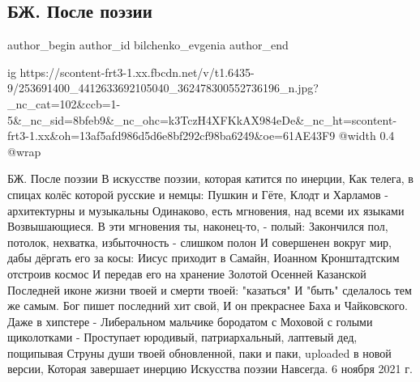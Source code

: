  
 
 
 
 
 
\subsection{БЖ. После поэзии}
\label{sec:06_11_2021.fb.bilchenko_evgenia.1.posle_poezii}
 
\ifcmt
 author_begin
   author_id bilchenko_evgenia
 author_end
\fi

\ifcmt
  ig https://scontent-frt3-1.xx.fbcdn.net/v/t1.6435-9/253691400_4412633692105040_362478300552736196_n.jpg?_nc_cat=102&ccb=1-5&_nc_sid=8bfeb9&_nc_ohc=k3TczH4XFKkAX984eDe&_nc_ht=scontent-frt3-1.xx&oh=13af5afd986d5d6e8bf292cf98ba6249&oe=61AE43F9
  @width 0.4
  @wrap 
\fi

БЖ. После поэзии
В искусстве поэзии, которая катится по инерции,
Как телега, в спицах колёс которой русские и немцы:
Пушкин и Гёте, Клодт и Харламов - архитектурны и музыкальны
Одинаково, есть мгновения, над всеми их языками
Возвышающиеся. В эти мгновения ты, наконец-то, - полый:
Закончился пол, потолок, нехватка, избыточность - слишком полон
И совершенен вокруг мир, дабы дёргать его за косы:
Иисус приходит в Самайн, Иоанном Кронштадтским отстроив космос
И передав его на хранение Золотой Осенней Казанской
Последней иконе жизни твоей и смерти твоей: "казаться"
И "быть" сделалось тем же самым. Бог пишет последний хит свой,
И он прекраснее Баха и Чайковского. Даже в хипстере -
Либеральном мальчике бородатом с Моховой с голыми щиколотками -
Проступает юродивый, патриархальный, лаптевый дед, пощипывая
Струны души твоей обновленной, паки и паки, uploaded в новой версии,
Которая завершает инерцию
Искусства поэзии
Навсегда.
6 ноября 2021 г.
